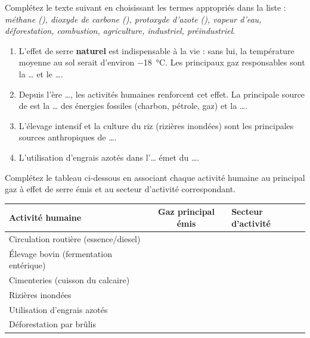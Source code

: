 \documentclass[11pt]{article}
\begin{document}
\begin{exercice}
Complétez le texte suivant en choisissant les termes appropriés dans la liste : \textit{méthane (), dioxyde de carbone (), protoxyde d'azote (), vapeur d'eau, déforestation, combustion, agriculture, industriel, préindustriel}.
\begin{enumerate}
\item L'effet de serre \textbf{naturel} est indispensable à la vie : sans lui, la température moyenne au sol serait d'environ \SI{-18}{\celsius}. Les principaux gaz responsables sont la \ldots{} et le \ldots{}.
\item Depuis l'ère \ldots{}, les activités humaines renforcent cet effet. La principale source de  est la \ldots{} des énergies fossiles (charbon, pétrole, gaz) et la \ldots{}.
\item L'élevage intensif et la culture du riz (rizières inondées) sont les principales sources anthropiques de \ldots{}.
\item L'utilisation d'engrais azotés dans l'\ldots{} émet du \ldots{}.
\end{enumerate}
\end{exercice}

\begin{exercice}
Complétez le tableau ci-dessous en associant chaque activité humaine au principal gaz à effet de serre émis et au secteur d'activité correspondant.
\begin{center}
\begin{tabularx}{\linewidth}{|X|c|X|}
\hline
\textbf{Activité humaine} & \textbf{Gaz principal émis} & \textbf{Secteur d'activité} \\
\hline
Circulation routière (essence/diesel) & & \\
\hline
Élevage bovin (fermentation entérique) & & \\
\hline
Cimenteries (cuisson du calcaire) & & \\
\hline
Rizières inondées & & \\
\hline
Utilisation d'engrais azotés & & \\
\hline
Déforestation par brûlis & & \\
\hline
\end{tabularx}
\end{center}
\end{exercice}
\end{document}
